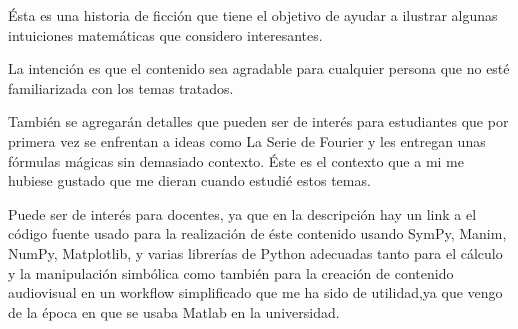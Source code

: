 \documentclass[preview]{standalone}
\begin{document}
\begin{center}
Ésta es una historia de ficción que tiene el objetivo de ayudar a ilustrar algunas intuiciones matemáticas que considero interesantes. 

$$ $$
La intención es que el contenido sea agradable para cualquier persona que no esté familiarizada con los temas tratados.  

$$ $$
También se agregarán detalles que pueden ser de interés para estudiantes que por primera vez se enfrentan a ideas como La Serie de Fourier y les entregan unas fórmulas mágicas sin demasiado contexto. Éste es el contexto que a mi me hubiese gustado que me dieran cuando estudié estos temas. 

$$ $$
Puede ser de interés para docentes, ya que en la descripción hay un link a el código fuente usado para la realización de éste contenido usando SymPy, Manim, NumPy, Matplotlib, y varias librerías de Python adecuadas tanto para el cálculo y la manipulación simbólica como también para la creación de contenido audiovisual en un workflow simplificado que me ha sido de utilidad,ya que vengo de la época en que se usaba Matlab en la universidad.
\end{center}
\end{document}
